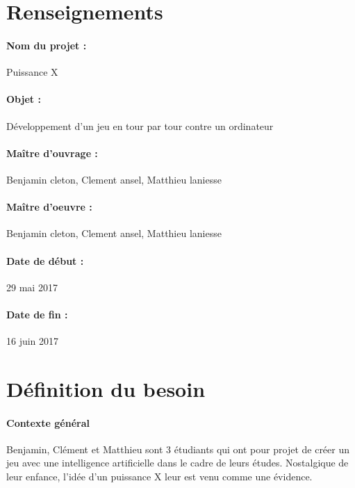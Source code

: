 \documentclass[a4paper,oneside]{article}
\title{\mytitle }
\author{Ginette et Roger}
\date{1\ier~juin 2015}
\begin{document}
\maketitle

\thispagestyle{fancyplain}



\section{Renseignements}

\paragraph{Nom du projet :}
Puissance X

\paragraph{Objet :}
Développement d'un jeu en tour par tour contre un ordinateur

\paragraph{Maître d'ouvrage :}
Benjamin cleton, Clement ansel, Matthieu laniesse

\paragraph{Maître d'oeuvre : }
Benjamin cleton, Clement ansel, Matthieu laniesse

\paragraph{Date de début :}
29 mai 2017

\paragraph{Date de fin :}
16 juin 2017



\newpage

\section{Définition du besoin}

\paragraph{Contexte général\\}
Benjamin, Clément et Matthieu sont 3 étudiants qui ont pour projet de créer un jeu avec une intelligence artificielle dans le cadre de leurs études.
Nostalgique de leur enfance, l'idée d'un puissance X leur est venu comme une évidence.
\end{document}
